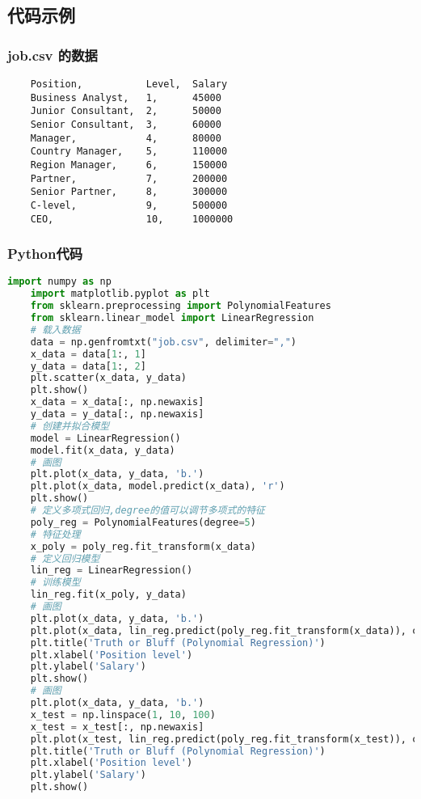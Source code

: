 \subsection*{代码示例}

\subsubsection{job.csv 的数据}

\begin{lstlisting}
    Position,           Level,  Salary
    Business Analyst,   1,      45000
    Junior Consultant,  2,      50000
    Senior Consultant,  3,      60000
    Manager,            4,      80000
    Country Manager,    5,      110000
    Region Manager,     6,      150000
    Partner,            7,      200000
    Senior Partner,     8,      300000
    C-level,            9,      500000
    CEO,                10,     1000000
\end{lstlisting}

\subsubsection{Python代码}

\begin{lstlisting}[language=Python]
    import numpy as np
    import matplotlib.pyplot as plt
    from sklearn.preprocessing import PolynomialFeatures
    from sklearn.linear_model import LinearRegression
    # 载入数据
    data = np.genfromtxt("job.csv", delimiter=",")
    x_data = data[1:, 1]
    y_data = data[1:, 2]
    plt.scatter(x_data, y_data)
    plt.show()
    x_data = x_data[:, np.newaxis]
    y_data = y_data[:, np.newaxis]
    # 创建并拟合模型
    model = LinearRegression()
    model.fit(x_data, y_data)
    # 画图
    plt.plot(x_data, y_data, 'b.')
    plt.plot(x_data, model.predict(x_data), 'r')
    plt.show()
    # 定义多项式回归,degree的值可以调节多项式的特征
    poly_reg = PolynomialFeatures(degree=5)
    # 特征处理
    x_poly = poly_reg.fit_transform(x_data)
    # 定义回归模型
    lin_reg = LinearRegression()
    # 训练模型
    lin_reg.fit(x_poly, y_data)
    # 画图
    plt.plot(x_data, y_data, 'b.')
    plt.plot(x_data, lin_reg.predict(poly_reg.fit_transform(x_data)), c='r')
    plt.title('Truth or Bluff (Polynomial Regression)')
    plt.xlabel('Position level')
    plt.ylabel('Salary')
    plt.show()
    # 画图
    plt.plot(x_data, y_data, 'b.')
    x_test = np.linspace(1, 10, 100)
    x_test = x_test[:, np.newaxis]
    plt.plot(x_test, lin_reg.predict(poly_reg.fit_transform(x_test)), c='r')
    plt.title('Truth or Bluff (Polynomial Regression)')
    plt.xlabel('Position level')
    plt.ylabel('Salary')
    plt.show()
\end{lstlisting}

